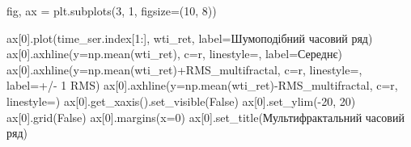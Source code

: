 \documentclass[
  letterpaper,
]{report}
\newenvironment{Shaded}{\begin{snugshade}}{\end{snugshade}}
\newcommand{\DecValTok}[1]{\textcolor[rgb]{0.68,0.00,0.00}{#1}}
\newcommand{\NormalTok}[1]{\textcolor[rgb]{0.00,0.23,0.31}{#1}}
\newcommand{\OperatorTok}[1]{\textcolor[rgb]{0.37,0.37,0.37}{#1}}
\newcommand{\StringTok}[1]{\textcolor[rgb]{0.13,0.47,0.30}{#1}}
\newcommand{\VariableTok}[1]{\textcolor[rgb]{0.07,0.07,0.07}{#1}}
\begin{document}
\begin{Shaded}
\begin{Highlighting}[]
\NormalTok{fig, ax }\OperatorTok{=}\NormalTok{ plt.subplots(}\DecValTok{3}\NormalTok{, }\DecValTok{1}\NormalTok{, figsize}\OperatorTok{=}\NormalTok{(}\DecValTok{10}\NormalTok{, }\DecValTok{8}\NormalTok{))}

\NormalTok{ax[}\DecValTok{0}\NormalTok{].plot(time\_ser.index[}\DecValTok{1}\NormalTok{:], wti\_ret, label}\OperatorTok{=}\StringTok{\textquotesingle{}Шумоподібний часовий ряд\textquotesingle{}}\NormalTok{)}
\NormalTok{ax[}\DecValTok{0}\NormalTok{].axhline(y}\OperatorTok{=}\NormalTok{np.mean(wti\_ret), c}\OperatorTok{=}\StringTok{\textquotesingle{}r\textquotesingle{}}\NormalTok{, linestyle}\OperatorTok{=}\StringTok{\textquotesingle{}{-}{-}\textquotesingle{}}\NormalTok{, label}\OperatorTok{=}\StringTok{\textquotesingle{}Середнє\textquotesingle{}}\NormalTok{)}
\NormalTok{ax[}\DecValTok{0}\NormalTok{].axhline(y}\OperatorTok{=}\NormalTok{np.mean(wti\_ret)}\OperatorTok{+}\NormalTok{RMS\_multifractal, c}\OperatorTok{=}\StringTok{\textquotesingle{}r\textquotesingle{}}\NormalTok{, linestyle}\OperatorTok{=}\StringTok{\textquotesingle{}{-}\textquotesingle{}}\NormalTok{, label}\OperatorTok{=}\StringTok{\textquotesingle{}+/{-} 1 RMS\textquotesingle{}}\NormalTok{)}
\NormalTok{ax[}\DecValTok{0}\NormalTok{].axhline(y}\OperatorTok{=}\NormalTok{np.mean(wti\_ret)}\OperatorTok{{-}}\NormalTok{RMS\_multifractal, c}\OperatorTok{=}\StringTok{\textquotesingle{}r\textquotesingle{}}\NormalTok{, linestyle}\OperatorTok{=}\StringTok{\textquotesingle{}{-}\textquotesingle{}}\NormalTok{)}
\NormalTok{ax[}\DecValTok{0}\NormalTok{].get\_xaxis().set\_visible(}\VariableTok{False}\NormalTok{)}
\NormalTok{ax[}\DecValTok{0}\NormalTok{].set\_ylim(}\OperatorTok{{-}}\DecValTok{20}\NormalTok{, }\DecValTok{20}\NormalTok{)}
\NormalTok{ax[}\DecValTok{0}\NormalTok{].grid(}\VariableTok{False}\NormalTok{)}
\NormalTok{ax[}\DecValTok{0}\NormalTok{].margins(x}\OperatorTok{=}\DecValTok{0}\NormalTok{)}
\NormalTok{ax[}\DecValTok{0}\NormalTok{].set\_title(}\StringTok{\textquotesingle{}Мультифрактальний часовий ряд\textquotesingle{}}\NormalTok{)}


\end{Highlighting}
\end{Shaded}
\end{document}
